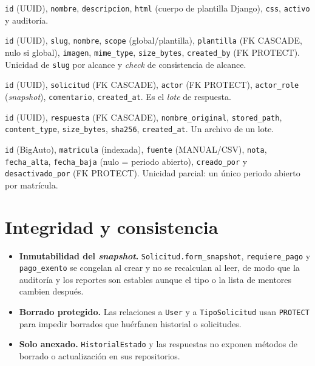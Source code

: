 \documentclass[12pt,letterpaper]{report}
\begin{document}
\begin{description}[leftmargin=0em, style=nextline]
  \item[\texttt{PlantillaSolicitud} (solicitudes)] \texttt{id} (UUID),
  \texttt{nombre}, \texttt{descripcion}, \texttt{html} (cuerpo de plantilla
  Django), \texttt{css}, \texttt{activo} y auditoría.

  \item[\texttt{PlantillaAsset} (solicitudes)] \texttt{id} (UUID), \texttt{slug},
  \texttt{nombre}, \texttt{scope} (global/plantilla), \texttt{plantilla} (FK
  CASCADE, nulo si global), \texttt{imagen}, \texttt{mime\_type},
  \texttt{size\_bytes}, \texttt{created\_by} (FK PROTECT). Unicidad de \texttt{slug}
  por alcance y \textit{check} de consistencia de alcance.

  \item[\texttt{RespuestaSolicitud} (solicitudes)] \texttt{id} (UUID),
  \texttt{solicitud} (FK CASCADE), \texttt{actor} (FK PROTECT),
  \texttt{actor\_role} (\textit{snapshot}), \texttt{comentario},
  \texttt{created\_at}. Es el \emph{lote} de respuesta.

  \item[\texttt{ArchivoRespuesta} (solicitudes)] \texttt{id} (UUID),
  \texttt{respuesta} (FK CASCADE), \texttt{nombre\_original},
  \texttt{stored\_path}, \texttt{content\_type}, \texttt{size\_bytes},
  \texttt{sha256}, \texttt{created\_at}. Un archivo de un lote.

  \item[\texttt{MentorPeriodo} (mentores)] \texttt{id} (BigAuto),
  \texttt{matricula} (indexada), \texttt{fuente} (MANUAL/CSV), \texttt{nota},
  \texttt{fecha\_alta}, \texttt{fecha\_baja} (nulo = periodo abierto),
  \texttt{creado\_por} y \texttt{desactivado\_por} (FK PROTECT). Unicidad parcial:
  un único periodo abierto por matrícula.
\end{description}

\section{Integridad y consistencia}

\begin{itemize}[leftmargin=1.4em]
  \item \textbf{Inmutabilidad del \textit{snapshot}.} \texttt{Solicitud.form\_snapshot},
  \texttt{requiere\_pago} y \texttt{pago\_exento} se congelan al crear y no se
  recalculan al leer, de modo que la auditoría y los reportes son estables aunque
  el tipo o la lista de mentores cambien después.
  \item \textbf{Borrado protegido.} Las relaciones a \texttt{User} y a
  \texttt{TipoSolicitud} usan \texttt{PROTECT} para impedir borrados que
  huérfanen historial o solicitudes.
  \item \textbf{Solo anexado.} \texttt{HistorialEstado} y las respuestas no
  exponen métodos de borrado o actualización en sus repositorios.
\end{itemize}
\end{document}
